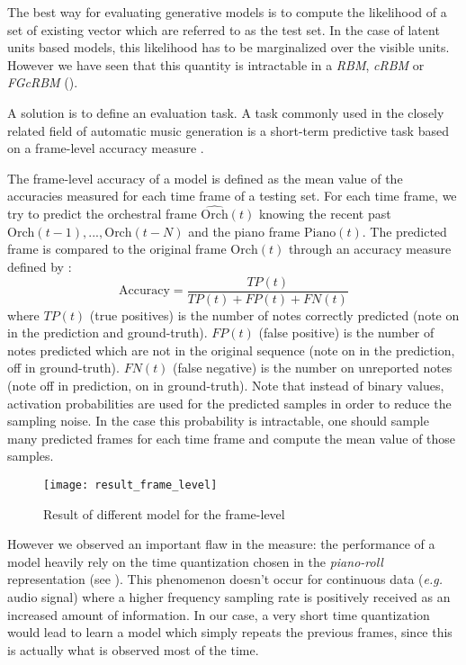 \documentclass[letterpaper]{article}
\begin{document}
The best way for evaluating generative models is to compute the likelihood of a set of existing vector which are referred to as the test set. In the case of latent units based models, this likelihood has to be marginalized over the visible units. However we have seen that this quantity is intractable in a \textit{RBM}, \textit{cRBM} or \textit{FGcRBM} ().

A solution is to define an evaluation task. A task commonly used in the closely related field of automatic music generation is a short-term predictive task based on a frame-level accuracy measure \cite{DBLP:journals/corr/YaoCVDD15,boulanger2012modeling,lavrenko2003polyphonic}.

The frame-level accuracy of a model is defined as the mean value of the accuracies measured for each time frame of a testing set.
For each time frame, we try to predict the orchestral frame $\hat{\text{Orch}}(t)$ knowing the recent past $\text{Orch}(t-1),...,\text{Orch}(t-N)$ and the piano frame $\text{Piano}(t)$. The predicted frame is compared to the original frame $\text{Orch}(t)$ through an accuracy measure \cite{boulanger2012modeling,DBLP:journals/corr/YaoCVDD15} defined by :
\begin{equation}
\text{Accuracy}  = \frac{TP(t)}{TP(t) + FP(t) + FN(t)}
\label{eq:accuracy}
\end{equation}
where $TP(t)$ (true positives) is the number of notes correctly predicted (note on in the prediction and ground-truth). $FP(t)$ (false positive) is the number of notes predicted which are not in the original sequence (note on in the prediction, off in ground-truth). $FN(t)$ (false negative) is the number on unreported notes (note off in prediction, on in ground-truth). 
Note that instead of binary values, activation probabilities are used for the predicted samples in order to reduce the sampling noise. In the case this probability is intractable, one should sample many predicted frames for each time frame and compute the mean value of those samples.

\begin{figure}
\centering
\texttt{[image: result\_frame\_level]}
\caption{Result of different model for the frame-level}
\label{fig:result_frame_level}
\end{figure}

However we observed an important flaw in the measure: the performance of a model heavily rely on the time quantization chosen in the \textit{piano-roll} representation (see ). This phenomenon doesn't occur for continuous data (\textit{e.g.} audio signal) where a higher frequency sampling rate is positively received as an increased amount of information. In our case, a very short time quantization would lead to learn a model which simply repeats the previous frames, since this is actually what is observed most of the time.
\end{document}
